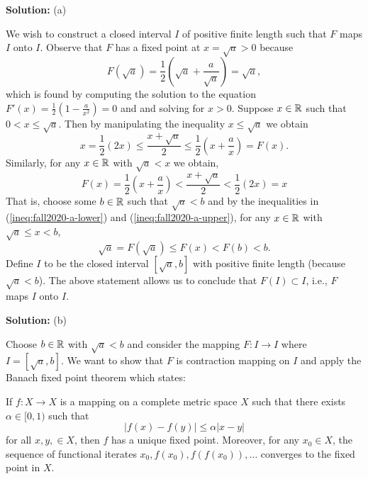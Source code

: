\documentclass{article}
\begin{document}
\textbf{Solution:} (a)

We wish to construct a closed interval $I$ of positive finite length such that $F$ maps $I$ onto $I$. Observe that $F$ has a fixed point at $x = \sqrt{a} > 0$ because 
	\[F(\sqrt{a}) = \frac{1}{2}\left(\sqrt{a} + \frac{a}{\sqrt{a}}\right) = \sqrt{a},\]
which is found by computing the solution to the equation $F'(x) = \frac{1}{2}\left(1 - \frac{a}{x^2}\right) = 0$ and and solving for $x>0$. Suppose $x\in\mathbb R$ such that $0 < x \leq \sqrt{a}$. Then by manipulating the inequality $x \leq \sqrt{a}$ we obtain 
	\begin{equation}\label{ineq:fall2020-a-lower}
		 x = \frac{1}{2} (2x) \leq  \frac{x + \sqrt{a}}{2} \leq \frac{1}{2}\left(x + \frac{a}{x}\right) = F(x).
	\end{equation}
Similarly, for any $x\in\mathbb R$ with $\sqrt{a} < x$ we obtain,
	\begin{equation}\label{ineq:fall2020-a-upper}
		 F(x) = \frac{1}{2}\left(x + \frac{a}{x}\right) < \frac{x + \sqrt{a}}{2} < \frac{1}{2} (2x) = x
	\end{equation}
That is, choose some $b\in\mathbb R$ such that $\sqrt{a} < b$ and by the inequalities in (\ref{ineq:fall2020-a-lower}) and (\ref{ineq:fall2020-a-upper}), for any $x\in\mathbb R$ with $\sqrt{a}\leq x < b$,
	\[\sqrt{a} = F(\sqrt{a}) \leq F(x) < F(b) < b.\]
Define $I$ to be the closed interval $[\sqrt{a}, b]$ with positive finite length (because $\sqrt{a} < b$). The above statement allows us to conclude that $F(I) \subset I$, i.e., $F$ maps $I$ onto $I$.

\textbf{Solution:} (b) 

Choose $b\in\mathbb R$ with $\sqrt{a} < b$ and consider the mapping $F: I\to I$ where $I = [\sqrt{a}, b]$. We want to show that $F$ is contraction mapping on $I$ and apply the Banach fixed point theorem which states:

If $f: X\to X$ is a mapping on a complete metric space $X$ such that there exists $\alpha \in [0,1)$ such that 
\[|f(x) - f(y)|\leq \alpha |x-y|\]
for all $x,y,\in X$, then $f$ has a unique fixed point. Moreover, for any $x_0\in X$, the sequence of functional iterates $x_0, f(x_0), f(f(x_0)),\dots$ converges to the fixed point in $X$. 
\end{document}
